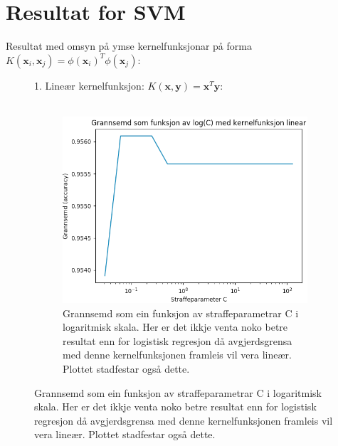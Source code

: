 \documentclass[oneside, nynorsk]{book}
\begin{document}
\section{Resultat for SVM}
Resultat med omsyn på ymse kernelfunksjonar på forma $K(\boldsymbol{x}_i,\boldsymbol{x}_j)=\phi(\boldsymbol{x}_i)^T\phi(\boldsymbol{x}_j)$: \\
\begin{figure}[h!]
  1. Lineær kernelfunksjon: $K(\boldsymbol{x},\boldsymbol{y})=\boldsymbol{x}^T\boldsymbol{y}$: \\\\
  \begin{subfigure}{\textwidth}
        \centering
        \centerline{\includegraphics[width=0.8\linewidth]{linear}}
        \caption{Grannsemd som ein funksjon av straffeparametrar C i logaritmisk skala. Her er det ikkje venta noko betre resultat enn for logistisk regresjon då avgjerdsgrensa med denne kernelfunksjonen framleis vil vera lineær. Plottet stadfestar også dette.}
        \label{linear}
    \end{subfigure}
\end{figure}
\newpage
\end{document}
